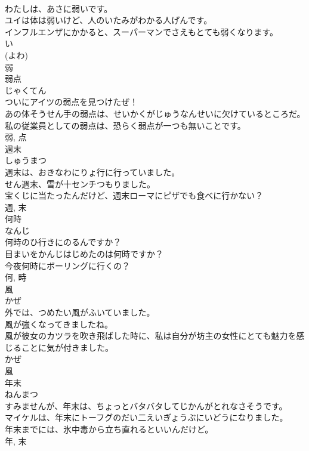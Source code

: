 \documentclass[8pt]{extreport}
\begin{document}
\begin{CJK}{UTF8}{min}
\\	わたしは、あさに弱いです。	
\\	ユイは体は弱いけど、人のいたみがわかる人げんです。	
\\	インフルエンザにかかると、スーパーマンでさえもとても弱くなります。	
\\	い 
\\	(よわ) 
\\	弱	
\\	弱点	
\\	じゃくてん	
\\	ついにアイツの弱点を見つけたぜ！	
\\	あの体そうせん手の弱点は、せいかくがじゅうなんせいに欠けているところだ。	
\\	私の従業員としての弱点は、恐らく弱点が一つも無いことです。	
\\	弱, 点	
\\	週末	
\\	しゅうまつ	
\\	週末は、おきなわにりょ行に行っていました。	
\\	せん週末、雪が十センチつもりました。	
\\	宝くじに当たったんだけど、週末ローマにピザでも食べに行かない？	
\\	週, 末	
\\	何時	
\\	なんじ	
\\	何時のひ行きにのるんですか？	
\\	目まいをかんじはじめたのは何時ですか？	
\\	今夜何時にボーリングに行くの？	
\\	何, 時	
\\	風	
\\	かぜ	
\\	外では、つめたい風がふいていました。	
\\	風が強くなってきましたね。	
\\	風が彼女のカツラを吹き飛ばした時に、私は自分が坊主の女性にとても魅力を感じることに気が付きました。	
\\	かぜ 
\\	風	
\\	年末	
\\	ねんまつ	
\\	すみませんが、年末は、ちょっとバタバタしてじかんがとれなさそうです。	
\\	マイケルは、年末にトーフグのだい二えいぎょうぶにいどうになりました。	
\\	年末までには、氷中毒から立ち直れるといいんだけど。	
\\	年, 末	

\end{CJK}
\end{document}
